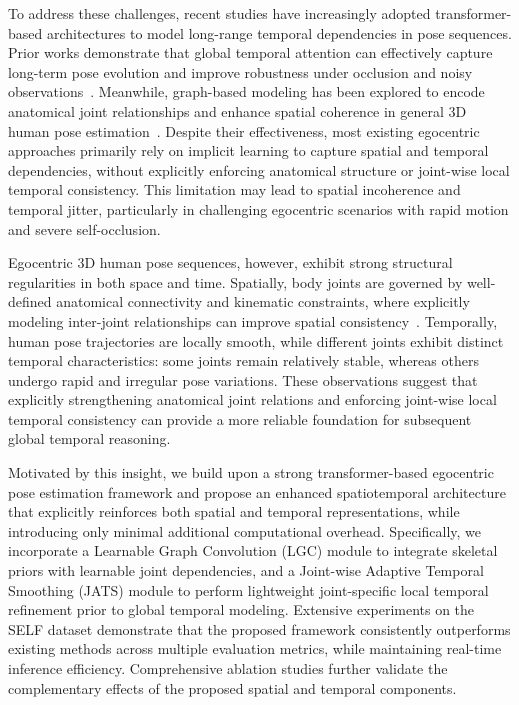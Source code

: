 \documentclass[conference]{IEEEtran}
\begin{document}
To address these challenges, recent studies have increasingly adopted transformer-based architectures to model long-range temporal dependencies in pose sequences. Prior works demonstrate that global temporal attention can effectively capture long-term pose evolution and improve robustness under occlusion and noisy observations~\citep{b1,b2,b8}. Meanwhile, graph-based modeling has been explored to encode anatomical joint relationships and enhance spatial coherence in general 3D human pose estimation~\citep{b9,b10}. Despite their effectiveness, most existing egocentric approaches primarily rely on implicit learning to capture spatial and temporal dependencies, without explicitly enforcing anatomical structure or joint-wise local temporal consistency. This limitation may lead to spatial incoherence and temporal jitter, particularly in challenging egocentric scenarios with rapid motion and severe self-occlusion.

Egocentric 3D human pose sequences, however, exhibit strong structural regularities in both space and time. Spatially, body joints are governed by well-defined anatomical connectivity and kinematic constraints, where explicitly modeling inter-joint relationships can improve spatial consistency~\citep{b9,b10}. Temporally, human pose trajectories are locally smooth, while different joints exhibit distinct temporal characteristics: some joints remain relatively stable, whereas others undergo rapid and irregular pose variations. These observations suggest that explicitly strengthening anatomical joint relations and enforcing joint-wise local temporal consistency can provide a more reliable foundation for subsequent global temporal reasoning.

Motivated by this insight, we build upon a strong transformer-based egocentric pose estimation framework and propose an enhanced spatiotemporal architecture that explicitly reinforces both spatial and temporal representations, while introducing only minimal additional computational overhead. Specifically, we incorporate a Learnable Graph Convolution (LGC) module to integrate skeletal priors with learnable joint dependencies, and a Joint-wise Adaptive Temporal Smoothing (JATS) module to perform lightweight joint-specific local temporal refinement prior to global temporal modeling. Extensive experiments on the SELF dataset demonstrate that the proposed framework consistently outperforms existing methods across multiple evaluation metrics, while maintaining real-time inference efficiency. Comprehensive ablation studies further validate the complementary effects of the proposed spatial and temporal components.
\end{document}
